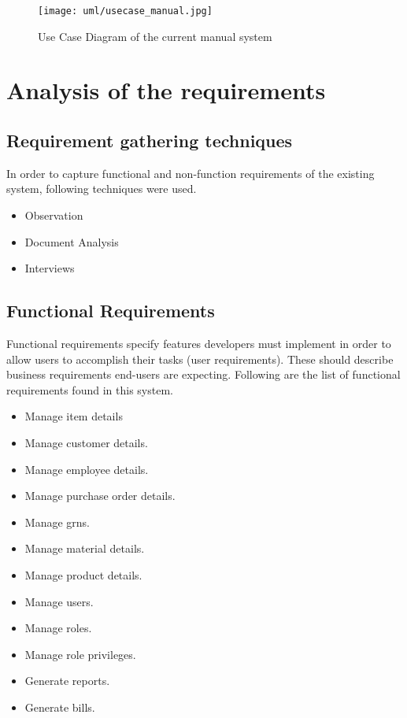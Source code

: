 \documentclass[12pt]{report}
\begin{document}
\begin{figure}[H]
	\centering
	\texttt{[image: uml/usecase\_manual.jpg]}
	\caption{Use Case Diagram of the current manual system}
\end{figure}

\section{Analysis of the requirements}

\subsection{Requirement gathering techniques}
In order to capture functional and non-function requirements of the existing system, following techniques were used.

\begin{itemize}
	\item Observation
	\item Document Analysis
	\item Interviews
\end{itemize}

\subsection{Functional Requirements}
Functional requirements specify features developers must implement in order to allow users to accomplish their tasks (user requirements).  These should describe business requirements end-users are expecting. Following are the list of functional requirements found in this system.

\begin{itemize}
	\item Manage item details
	\item Manage customer details.
	\item Manage employee details.
	\item Manage purchase order details.
	\item Manage \acrshort{grn}s.
	\item Manage material details.
	\item Manage product details.
	\item Manage users.
	\item Manage roles.
	\item Manage role privileges.
	\item Generate reports.
	\item Generate bills.
\end{itemize}
\end{document}
